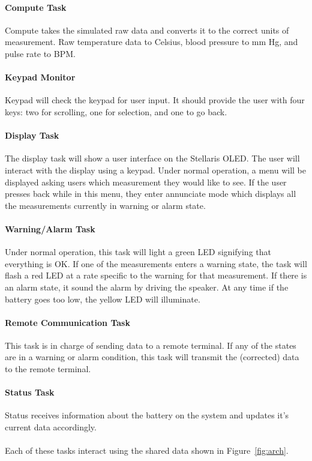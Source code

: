 \documentclass[12pt]{article} %
\begin{document}
    \paragraph{Compute Task} Compute takes the simulated raw data and converts it to the
    correct units of measurement. Raw temperature data to Celsius, blood pressure
    to mm Hg, and pulse rate to BPM.

    \paragraph{Keypad Monitor} Keypad will check the keypad for user input. It
    should provide the user with four keys: two for scrolling, one for selection,
    and one to go back.

    \paragraph{Display Task} The display task will show a user interface on the
    Stellaris OLED. The user will interact with the display using a keypad. Under
    normal operation, a menu will be displayed asking users which measurement they
    would like to see. If the user presses back while in this menu, they enter
    annunciate mode which displays all the measurements currently in warning or
    alarm state.

    \paragraph{Warning/Alarm Task} Under normal operation, this task will light a
    green LED signifying that everything is OK. If one of the measurements enters
    a warning state, the task will flash a red LED at a rate specific to the
    warning for that measurement. If there is an alarm state, it sound the alarm
    by driving the speaker. At any time if the battery goes too low, the yellow
    LED will illuminate.

    \paragraph{Remote Communication Task} This task is in charge of sending data to
    a remote terminal. If any of the states are in a warning or alarm condition,
    this task will transmit the (corrected) data to the remote terminal.

    \paragraph{Status Task} Status receives information about the battery on the
    system and updates it's current data accordingly.
    \\\\
    Each of these tasks interact using the shared data shown in Figure~\ref{fig:arch}. 
\end{document}
